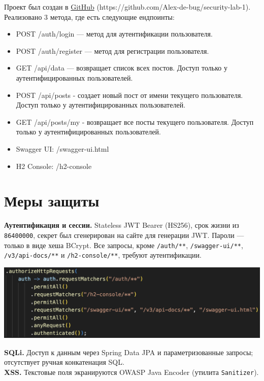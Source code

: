 \documentclass{article}
\begin{document}
Проект был создан в \href{https://github.com/Alex-de-bug/security-lab-1}{GitHub} (https://github.com/Alex-de-bug/security-lab-1).
Реализовано 3 метода, где есть следующие ендпоинты:

\begin{itemize}
  \item POST /auth/login — метод для аутентификации пользователя.
  \item POST /auth/register — метод для регистрации пользователя.
  \item GET /api/data — возвращает список всех постов. Доступ только у аутентифицированных пользователей.
  \item POST /api/posts - создает новый пост от имени текущего пользователя. Доступ только у аутентифицированных пользователей.
  \item GET /api/posts/my - возвращает все посты текущего пользователя. Доступ только у аутентифицированных пользователей.
  \item Swagger UI: /swagger-ui.html
  \item H2 Console: /h2-console
\end{itemize}

\section*{Меры защиты}
\textbf{Аутентификация и сессии.} Stateless JWT Bearer (HS256), срок жизни из \texttt{86400000}, секрет был сгенерирован на сайте для генерации JWT. Пароли --- только в виде хеша BCrypt. Все запросы, кроме \texttt{/auth/**}, \texttt{/swagger-ui/**}, \texttt{/v3/api-docs/**} и \texttt{/h2-console/**}, требуют аутентификации.\\

\begin{center}
  \includegraphics[width=.9\textwidth]{secur.png}
\end{center}

\textbf{SQLi.} Доступ к данным через Spring Data JPA и параметризованные запросы; отсутствует ручная конкатенация SQL.\\

\textbf{XSS.} Текстовые поля экранируются OWASP Java Encoder (утилита \texttt{Sanitizer}).\\
\end{document}
